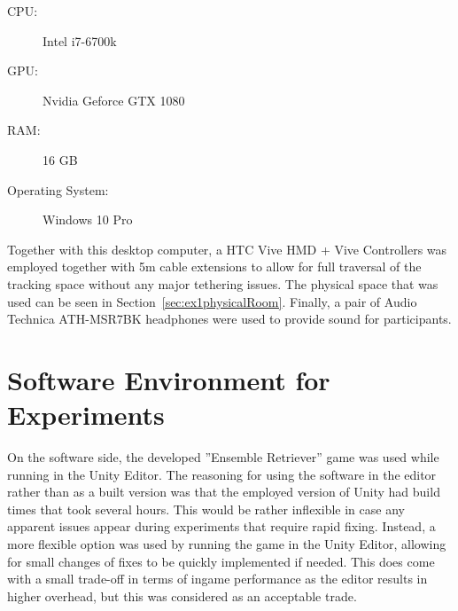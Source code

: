 \begin{description}
   \item[CPU: ] Intel i7-6700k
   \item[GPU: ] Nvidia Geforce GTX 1080
   \item[RAM: ] 16 GB
   \item[Operating System: ] Windows 10 Pro
\end{description}

Together with this desktop computer, a HTC Vive HMD + Vive Controllers was employed together with 5m cable extensions to allow for full traversal of the tracking space without any major tethering issues. The physical space that was used can be seen in Section~\ref{sec:ex1physicalRoom}. Finally, a pair of Audio Technica ATH-MSR7BK headphones were used to provide sound for participants. 

\section{Software Environment for Experiments}
On the software side, the developed ''Ensemble Retriever'' game was used while running in the Unity Editor. The reasoning for using the software in the editor rather than as a built version was that the employed version of Unity had build times that took several hours. This would be rather inflexible in case any apparent issues appear during experiments that require rapid fixing. Instead, a more flexible option was used by running the game in the Unity Editor, allowing for small changes of fixes to be quickly implemented if needed. This does come with a small trade-off in terms of ingame performance as the editor results in higher overhead, but this was considered as an acceptable trade. 